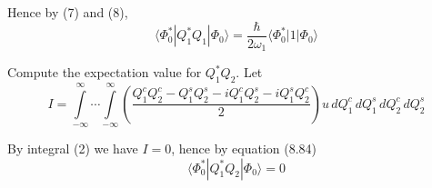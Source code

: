 \documentclass[12pt]{article}
\begin{document}
Hence by (7) and (8),
\begin{equation*}
\langle\Phi_0^*|Q_1^*Q_1|\Phi_0\rangle=\frac{\hbar}{2\omega_1}\langle\Phi_0^*|1|\Phi_0\rangle
\end{equation*}

Compute the expectation value for $Q_1^*Q_2$.
Let
\begin{equation*}
I=\int\limits_{-\infty}^\infty\cdots\int\limits_{-\infty}^\infty
\left(\frac{Q_1^cQ_2^c-Q_1^sQ_2^s-iQ_1^cQ_2^s-iQ_1^sQ_2^c}{2}\right)
u\,dQ_1^c\,dQ_1^s\,dQ_2^c\,dQ_2^s
\end{equation*}

By integral (2) we have $I=0$, hence by equation (8.84)
\begin{equation*}
\langle\Phi_0^*|Q_1^*Q_2|\Phi_0\rangle=0
\end{equation*}
\end{document}
